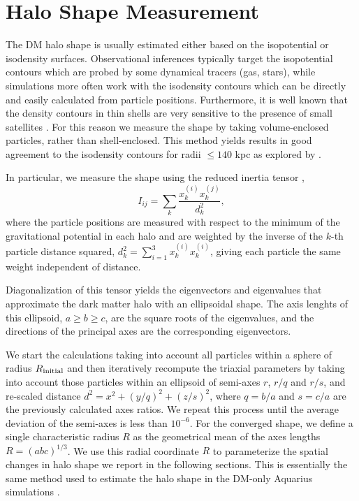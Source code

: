 \documentclass[usenatbib]{mnras}
\begin{document}
\section{Halo Shape Measurement}
\label{sec:method}

The DM halo shape is usually estimated either based on the isopotential or
isodensity surfaces.   
Observational inferences typically target the 
isopotential contours which are probed by some dynamical tracers (gas, stars), while
simulations more often work with the isodensity contours which can be directly and easily
calculated from particle positions.  
Furthermore, it is well known that the density contours in thin shells are very sensitive to
the presence of small satellites \citep{Springel2004}.  
For this reason we measure the shape by taking
volume-enclosed particles, rather than shell-enclosed.  
This method yields results in good agreement to the isodensity
contours for radii $\leq 140$ kpc as explored by
\citet{VeraCiro11}.  


In particular, we measure the shape using the reduced inertia tensor
\citep{Allgood06},  
\begin{equation}
I_{ij} = \sum_k \frac{x_k^{(i)}x_k^{(j)}}{d^2_k},
\label{eq:inertia}
\end{equation}
where the particle positions are measured with respect to the minimum of the
gravitational potential in each halo and are weighted by the inverse of 
the $k$-th particle distance squared, $d_k^2 = \sum_{i=1}^3 x_k^{(i)} x_k^{(i)}$, giving each particle the same
weight independent of distance.

Diagonalization of this tensor yields the eigenvectors and
eigenvalues that approximate the dark matter halo with an ellipsoidal shape.
The axis lenghts of this ellipsoid, $a\geq b \geq c$, are the square
roots of the  eigenvalues, and the directions of the principal
axes are the corresponding eigenvectors. 

We start the calculations taking into account all particles within a
sphere of radius $R_{\rm initial}$ and then iteratively recompute the
triaxial parameters by taking into account those particles within an ellipsoid of semi-axes
$r$, $r/q$ and $r/s$, and re-scaled distance $d^2=x^2+(y/q)^2+(z/s)^2$, where $q
= b/a$ and $s=c/a$ are the previously calculated axes ratios. 
We repeat this process until the average deviation of the semi-axes is
less than $10^{-6}$. For the converged shape, we define a single characteristic radius $R$ 
as the geometrical mean of the axes lengths $R=(abc)^{1/3}$.
We use this radial coordinate $R$ to parameterize the spatial changes
in halo shape we report in the following sections.
This is essentially the same method used to estimate the halo shape in the DM-only
Aquarius simulations \citep{VeraCiro11}. 
\end{document}
